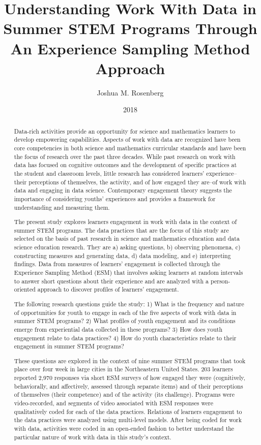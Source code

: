 \documentclass[]{msu-thesis}
\title{Understanding Work With Data in Summer STEM Programs Through An Experience Sampling Method Approach}
\author{Joshua M. Rosenberg}
\date{2018}
\theoremstyle{definition}
\theoremstyle{definition}
\theoremstyle{definition}
\theoremstyle{remark}
\begin{document}

\maketitlepage
\begin{abstract}

Data-rich activities provide an opportunity for science and mathematics learners to develop empowering capabilities. Aspects of work with data are recognized have been core competencies in both science and mathematics curricular standards and have been the focus of research over the past three decades. While past research on work with data has focused on cognitive outcomes and the development of specific practices at the student and classroom levels, little research has considered learners' experience--their perceptions of themselves, the activity, and of how engaged they are--of work with data and engaging in data science. Contemporary engagement theory suggests the importance of considering youths' experiences and provides a framework for understanding and measuring them.

The present study explores learners engagement in work with data in the context of summer STEM programs. The data practices that are the focus of this study are selected on the basis of past research in science and mathematics education and data science education research. They are a) asking questions, b) observing phenomena, c) constructing measures and generating data, d) data modeling, and e) interpreting findings. Data from measures of learners' engagement is collected through the Experience Sampling Method (ESM) that involves asking learners at random intervals to answer short questions about their experience and are analyzed with a person-oriented approach to discover profiles of learners' engagement.

The following research questions guide the study: 1) What is the frequency and nature of opportunities for youth to engage in each of the five aspects of work with data in summer STEM programs? 2) What profiles of youth engagement and its conditions emerge from experiential data collected in these programs? 3) How does youth engagement relate to data practices? 4) How do youth characteristics relate to their engagement in summer STEM programs?

These questions are explored in the context of nine summer STEM programs that took place over four week in large cities in the Northeastern United States. 203 learners reported 2,970 responses via short ESM surveys of how engaged they were (cognitively, behaviorally, and affectively, assessed through separate items) and of their perceptions of themselves (their competence) and of the activity (its challenge). Programs were video-recorded, and segments of video associated with ESM responses were qualitatively coded for each of the data practices. Relations of learners engagement to the data practices were analyzed using multi-level models. After being coded for work with data, activities were coded in an open-ended fashion to better understand the particular nature of work with data in this study's context.


\end{abstract}
\end{document}

